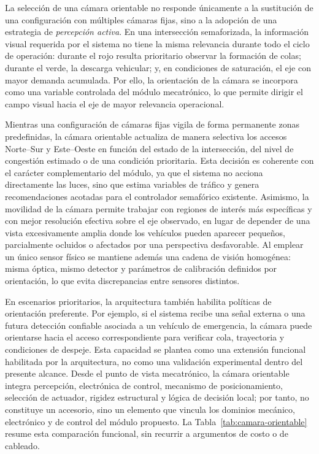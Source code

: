 La selección de una cámara orientable no responde únicamente a la sustitución de una configuración con
múltiples cámaras fijas, sino a la adopción de una estrategia de \emph{percepción activa}. En una intersección
semaforizada, la información visual requerida por el sistema no tiene la misma relevancia durante todo el ciclo
de operación: durante el rojo resulta prioritario observar la formación de colas; durante el verde, la descarga
vehicular; y, en condiciones de saturación, el eje con mayor demanda acumulada. Por ello, la orientación de la
cámara se incorpora como una variable controlada del módulo mecatrónico, lo que permite dirigir el campo visual
hacia el eje de mayor relevancia operacional.

Mientras una configuración de cámaras fijas vigila de forma permanente zonas predefinidas, la cámara orientable
actualiza de manera selectiva los accesos Norte--Sur y Este--Oeste en función del estado de la intersección,
del nivel de congestión estimado o de una condición prioritaria. Esta decisión es coherente con el
carácter complementario del módulo, ya que el sistema no acciona directamente las luces, sino que estima
variables de tráfico y genera recomendaciones acotadas para el controlador semafórico existente. Asimismo, la
movilidad de la cámara permite trabajar con regiones de interés más específicas y con mejor resolución efectiva
sobre el eje observado, en lugar de depender de una vista excesivamente amplia donde los vehículos pueden
aparecer pequeños, parcialmente ocluidos o afectados por una perspectiva desfavorable. Al emplear un único
sensor físico se mantiene además una cadena de visión homogénea: misma óptica, mismo detector y parámetros de
calibración definidos por orientación, lo que evita discrepancias entre sensores distintos.

En escenarios prioritarios, la arquitectura también habilita políticas de orientación preferente. Por ejemplo,
si el sistema recibe una señal externa o una futura detección confiable asociada a un vehículo de emergencia, la
cámara puede orientarse hacia el acceso correspondiente para verificar cola, trayectoria y condiciones de
despeje. Esta capacidad se plantea como una extensión funcional habilitada por la arquitectura, no como una
validación experimental dentro del presente alcance. Desde el punto de vista mecatrónico, la cámara orientable
integra percepción, electrónica de control, mecanismo de posicionamiento, selección de actuador, rigidez
estructural y lógica de decisión local; por tanto, no constituye un accesorio, sino un elemento que vincula los
dominios mecánico, electrónico y de control del módulo propuesto. La Tabla~\ref{tab:camara-orientable} resume
esta comparación funcional, sin recurrir a argumentos de costo o de cableado.

